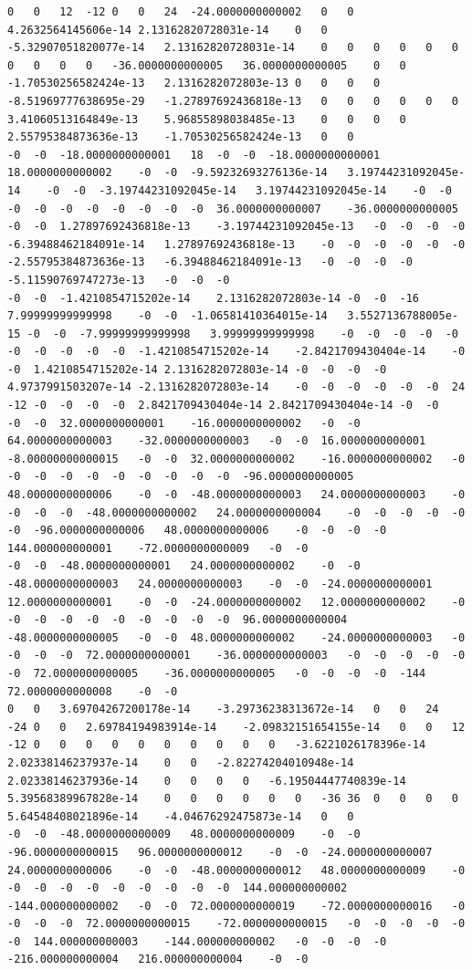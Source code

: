 \documentclass[12pt]{report} %
\begin{document}
\begin{landscape}
\begin{lstlisting}[numbers=none, basicstyle=\ttfamily\tiny, captionpos=b, caption={Matriz de coeficientes $W = G^{-1}$ ($54\times54$) calculada con MATLAB, sin redondear.}, label=cod:W-matlab]
0	0	12	-12	0	0	24	-24.0000000000002	0	0	4.2632564145606e-14	2.13162820728031e-14	0	0	-5.32907051820077e-14	2.13162820728031e-14	0	0	0	0	0	0	0	0	0	0	-36.0000000000005	36.0000000000005	0	0	-1.70530256582424e-13	2.1316282072803e-13	0	0	0	0	-8.51969777638695e-29	-1.27897692436818e-13	0	0	0	0	0	0	3.41060513164849e-13	5.96855898038485e-13	0	0	0	0	2.55795384873636e-13	-1.70530256582424e-13	0	0
-0	-0	-18.0000000000001	18	-0	-0	-18.0000000000001	18.0000000000002	-0	-0	-9.59232693276136e-14	3.19744231092045e-14	-0	-0	-3.19744231092045e-14	3.19744231092045e-14	-0	-0	-0	-0	-0	-0	-0	-0	-0	-0	36.0000000000007	-36.0000000000005	-0	-0	1.27897692436818e-13	-3.19744231092045e-13	-0	-0	-0	-0	-6.39488462184091e-14	1.27897692436818e-13	-0	-0	-0	-0	-0	-0	-2.55795384873636e-13	-6.39488462184091e-13	-0	-0	-0	-0	-5.11590769747273e-13	-0	-0	-0
-0	-0	-1.4210854715202e-14	2.1316282072803e-14	-0	-0	-16	7.99999999999998	-0	-0	-1.06581410364015e-14	3.5527136788005e-15	-0	-0	-7.99999999999998	3.99999999999998	-0	-0	-0	-0	-0	-0	-0	-0	-0	-0	-1.4210854715202e-14	-2.8421709430404e-14	-0	-0	1.4210854715202e-14	2.1316282072803e-14	-0	-0	-0	-0	4.9737991503207e-14	-2.1316282072803e-14	-0	-0	-0	-0	-0	-0	24	-12	-0	-0	-0	-0	2.8421709430404e-14	2.8421709430404e-14	-0	-0
-0	-0	32.0000000000001	-16.0000000000002	-0	-0	64.0000000000003	-32.0000000000003	-0	-0	16.0000000000001	-8.00000000000015	-0	-0	32.0000000000002	-16.0000000000002	-0	-0	-0	-0	-0	-0	-0	-0	-0	-0	-96.0000000000005	48.0000000000006	-0	-0	-48.0000000000003	24.0000000000003	-0	-0	-0	-0	-48.0000000000002	24.0000000000004	-0	-0	-0	-0	-0	-0	-96.0000000000006	48.0000000000006	-0	-0	-0	-0	144.000000000001	-72.0000000000009	-0	-0
-0	-0	-48.0000000000001	24.0000000000002	-0	-0	-48.0000000000003	24.0000000000003	-0	-0	-24.0000000000001	12.0000000000001	-0	-0	-24.0000000000002	12.0000000000002	-0	-0	-0	-0	-0	-0	-0	-0	-0	-0	96.0000000000004	-48.0000000000005	-0	-0	48.0000000000002	-24.0000000000003	-0	-0	-0	-0	72.0000000000001	-36.0000000000003	-0	-0	-0	-0	-0	-0	72.0000000000005	-36.0000000000005	-0	-0	-0	-0	-144	72.0000000000008	-0	-0
0	0	3.69704267200178e-14	-3.29736238313672e-14	0	0	24	-24	0	0	2.69784194983914e-14	-2.09832151654155e-14	0	0	12	-12	0	0	0	0	0	0	0	0	0	0	-3.6221026178396e-14	2.02338146237937e-14	0	0	-2.82274204010948e-14	2.02338146237936e-14	0	0	0	0	-6.19504447740839e-14	5.39568389967828e-14	0	0	0	0	0	0	-36	36	0	0	0	0	5.64548408021896e-14	-4.04676292475873e-14	0	0
-0	-0	-48.0000000000009	48.0000000000009	-0	-0	-96.0000000000015	96.0000000000012	-0	-0	-24.0000000000007	24.0000000000006	-0	-0	-48.0000000000012	48.0000000000009	-0	-0	-0	-0	-0	-0	-0	-0	-0	-0	144.000000000002	-144.000000000002	-0	-0	72.0000000000019	-72.0000000000016	-0	-0	-0	-0	72.0000000000015	-72.0000000000015	-0	-0	-0	-0	-0	-0	144.000000000003	-144.000000000002	-0	-0	-0	-0	-216.000000000004	216.000000000004	-0	-0

\end{lstlisting}
\end{landscape}
\end{document}
